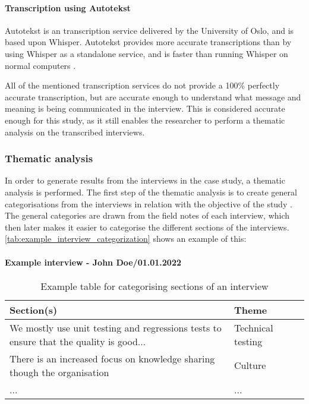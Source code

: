 \paragraph{Transcription using Autotekst}
Autotekst is an transcription service delivered by the University of Oslo, and is based upon Whisper. Autotekst provides more accurate transcriptions than by using Whisper as a standalone service, and is faster than running Whisper on normal computers \cite{autotekst_2023}.

All of the mentioned transcription services do not provide a 100\% perfectly accurate transcription, but are accurate enough to understand what message and meaning is being communicated in the interview. This is considered accurate enough for this study, as it still enables the researcher to perform a thematic analysis on the transcribed interviews.

\subsubsection{Thematic analysis}
In order to generate results from the interviews in the case study, a thematic analysis is performed. The first step of the thematic analysis is to create general categorisations from the interviews in relation with the objective of the study \cite{bjo_2022}. The general categories are drawn from the field notes of each interview, which then later makes it easier to categorise the different sections of the interviews. \autoref{tab:example_interview_categorization} shows an example of this:

\paragraph{Example interview - John Doe/01.01.2022} \hspace{0cm}

\begin{table}[h]
\begin{tabular}{|p{0.75\linewidth}|p{0.25\linewidth}|}
\hline
\textbf{Section(s)} & \textbf{Theme} \\ \hline
We mostly use unit testing and regressions tests to ensure that the quality is good... & Technical testing \\ \hline
There is an increased focus on knowledge sharing though the organisation & Culture \\ \hline
... & ... \\ \hline
\end{tabular}
\caption{Example table for categorising sections of an interview}
\label{tab:example_interview_categorization}
\end{table}

